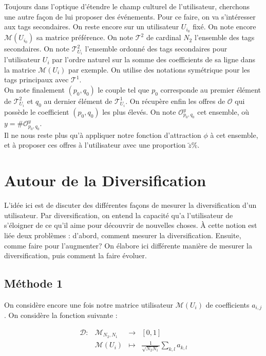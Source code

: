\documentclass[11pt, oneside]{article}
\begin{document}
Toujours dans l'optique d'étendre le champ culturel de l'utilisateur, cherchons une autre façon de lui proposer des événements. Pour ce faire, on va s'intéresser aux tags secondaires. On reste encore sur un utilisateur $U_{i_0}$ fixé. On note encore $\mathcal{M} (U_{i_0})$ sa matrice préférence. On note $\mathcal{T}^2$ de cardinal $N_2$ l'ensemble des tags secondaires. On note $\mathcal{T}^2_{U_i}$ l'ensemble ordonné des tags secondaires pour l'utilisateur $U_i$ par l'ordre naturel sur la somme des coefficients de sa ligne dans la matrice $\mathcal{M} (U_{i})$ par exemple. On utilise des notations symétrique pour les tags principaux avec $\mathcal{T}^1$. \\
On note finalement $(p_0,q_0)$ le couple tel que $p_0$ corresponde au premier élément de $\mathcal{T}^2_{U_i}$ et $q_0$ au dernier élément de $\mathcal{T}^1_{U_i}$. On récupère enfin les offres de $\mathcal{O}$ qui possède le coefficient $(p_0,q_0)$ les plus élevés. On note $\mathcal{O}_{p_0,q_0}^y$ cet ensemble, où $y = \# \mathcal{O}_{p_0,q_0}^y$. \\

Il ne nous reste plus qu'à appliquer notre fonction d'attraction $\phi$ à cet ensemble, et à proposer ces offres à l'utilisateur avec une proportion $\tilde{z} \%$.

\section{Autour de la Diversification}

L'idée ici est de discuter des différentes façons de mesurer la diversification d'un utilisateur. Par diversification, on entend la capacité qu'a l'utilisateur de s'éloigner de ce qu'il aime pour découvrir de nouvelles choses. À cette notion est liée deux problèmes : d'abord, comment mesurer la diversification. Ensuite, comme faire pour l'augmenter? On élabore ici différente manière de mesurer la diversification, puis comment la faire évoluer. 

\subsection{Méthode 1} 

On considère encore une fois notre matrice utilisateur $\mathcal{M} (U_i)$ de coefficients $a_{i,j}$. On considère la fonction suivante : 

\begin{center}
\[
\begin{array}{l|rcl}
\mathcal{D} : &  \mathcal{M}_{N_2,N_1} & \longrightarrow & [0,1] \\
    & \mathcal{M} (U_i) & \longmapsto & \frac{1}{\sqrt{N_2 N_1}} \displaystyle \sum _{k,l} a_{k,l}
    
    \end{array}
\]

\end{center}
\end{document}
